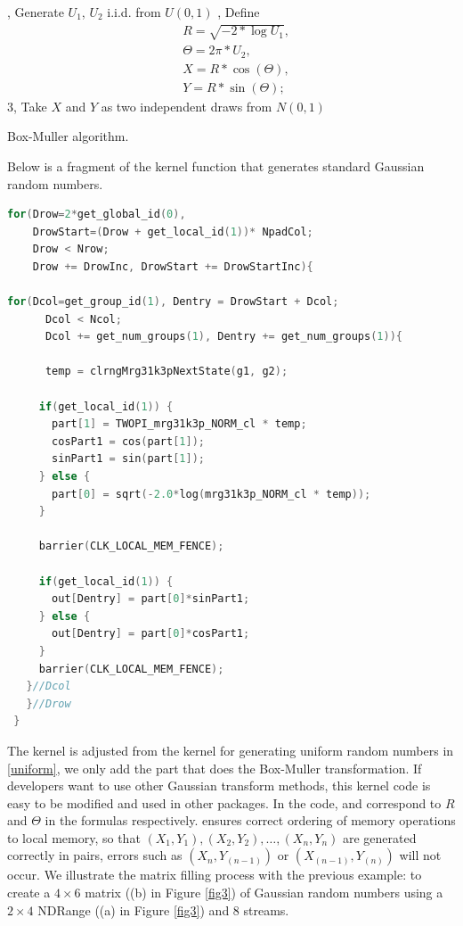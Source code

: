 \documentclass[article,nojss]{jss}\usepackage[]{graphicx}\usepackage[]{color}
\begin{document}
\begin{algorithm*}[H] \label{algorithm1}
, Generate $U_1$, $U_2$ i.i.d. from $U (0,1)$ , Define \begin{align*} 
& R = \sqrt{-2*\log U_1},\\
&  \Theta = 2\pi*U_2,\\
&  X=R*\cos(\Theta),\\
& Y=R*\sin(\Theta);\;\end{align*}
 3, Take $X$ and $Y$ as two independent draws from $N(0,1)$\;
 \caption{Box-Muller algorithm.}
\end{algorithm*}
%
Below is a fragment of the kernel function that generates standard Gaussian random numbers. 
%
\begin{framed}
\begin{lstlisting}[language=C,basicstyle=\small,label=normal]
for(Drow=2*get_global_id(0), 
    DrowStart=(Drow + get_local_id(1))* NpadCol;
    Drow < Nrow; 
    Drow += DrowInc, DrowStart += DrowStartInc){
      
for(Dcol=get_group_id(1), Dentry = DrowStart + Dcol;
      Dcol < Ncol;
      Dcol += get_num_groups(1), Dentry += get_num_groups(1)){
      
      temp = clrngMrg31k3pNextState(g1, g2);
     
     if(get_local_id(1)) {
       part[1] = TWOPI_mrg31k3p_NORM_cl * temp;
       cosPart1 = cos(part[1]);
       sinPart1 = sin(part[1]);
     } else {
       part[0] = sqrt(-2.0*log(mrg31k3p_NORM_cl * temp));
     }
     
     barrier(CLK_LOCAL_MEM_FENCE);
     
     if(get_local_id(1)) {
       out[Dentry] = part[0]*sinPart1;
     } else {
       out[Dentry] = part[0]*cosPart1;
     }
     barrier(CLK_LOCAL_MEM_FENCE);
   }//Dcol
   }//Drow
 }
\end{lstlisting}
\end{framed}
The kernel is adjusted from the kernel for generating uniform random numbers in \ref{uniform}, we only add the part that does the Box-Muller transformation. If developers want to use other Gaussian transform methods, this kernel code is easy to be modified and used in other  packages.  In the code,  and  correspond to $R$ and $\Theta$ in the formulas respectively.  ensures correct ordering of memory operations to local memory, so that $(X_1,Y_1), (X_2,Y_2), \dots, (X_n,Y_n)$ are generated correctly in pairs, errors such as $(X_n, Y_{(n-1)})$ or $(X_{(n-1)}, Y_{(n)})$ will not occur. We illustrate the matrix filling process with the previous example: to create a $4 \times 6$ matrix ((b) in Figure \ref{fig3}) of Gaussian random numbers using a $2 \times 4$ NDRange ((a) in Figure \ref{fig3}) and 8 streams. 
\end{document}

